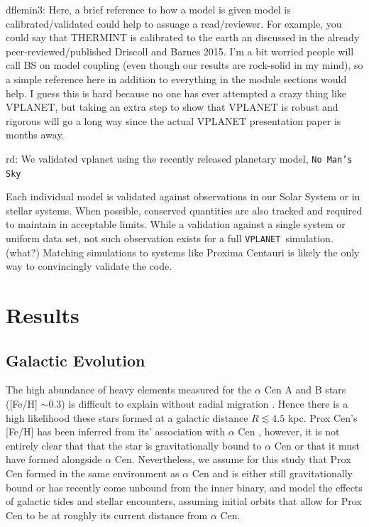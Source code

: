 \documentclass[preprint,12pt]{aastex}
\newcommand{\xxx}[1]{{\color{red} #1}} %
\def\vplanet{\texttt{\footnotesize{VPLANET}}\xspace}
\begin{document}
\xxx{dflemin3: Here, a brief reference to how a model is given model is calibrated/validated
could help to assuage a read/reviewer.  For example, you could say that THERMINT is calibrated
to the earth an discussed in the already peer-reviewed/published Driscoll and Barnes 2015.  I'm a bit 
worried people will call BS on model coupling (even though our results are rock-solid in my mind), so
a simple reference here in addition to everything in the module sections would help.  I guess this is hard because
no one has ever attempted a crazy thing like VPLANET, but taking an extra step to show that VPLANET is robust
and rigorous will go a long way since the actual VPLANET presentation paper is months away.}

\xxx{rd: We validated vplanet using the recently released planetary model, \texttt{No Man's Sky}}

Each individual model is validated against observations in our Solar
System or in stellar systems. When possible, conserved quantities are
also tracked and \xxx{required to maintain in acceptable limits}. \xxx{While a
validation against a single system or uniform data set, not such
observation exists for a full \vplanet~simulation. (what?)} Matching
simulations to systems like Proxima Centauri is likely the only way to
\xxx{convincingly} validate the code.

\section{Results\label{sec:results}}

\subsection{Galactic Evolution}
\label{sec:results:galactic}
The high abundance of heavy elements measured for the $\alpha$ Cen 
A and B stars ([Fe/H] $\sim 0.3$) is difficult to explain without radial 
migration \citep{Kordopatis15,Loebman16}. Hence there is a high likelihood 
these stars formed at a galactic distance $R\lesssim 4.5$ kpc. Prox Cen's [Fe/H] 
has been inferred from its' association with $\alpha$ Cen \citep{Johnson2009},
however, it is not entirely clear that that the star is gravitationally bound to 
$\alpha$ Cen \citep{MatvienkoOrlov14} or that it must have formed alongside 
$\alpha$ Cen. Nevertheless, we assume for this study that Prox Cen formed in 
the same environment as $\alpha$ Cen and is either still gravitationally bound or
has recently come unbound from the inner binary, and model the effects of 
galactic tides and stellar encounters, assuming initial orbits that allow for 
Prox Cen to be at roughly its current distance from $\alpha$ Cen.
\end{document}
